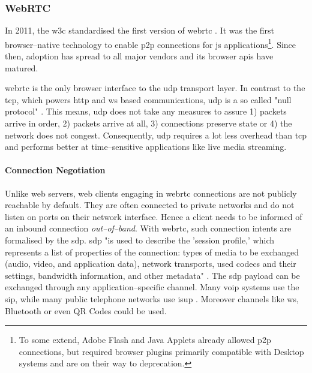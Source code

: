 \subsubsection{WebRTC}

In 2011, the \gls{w3c} standardised the first version of \gls{webrtc} \cite{webrtc-w3c}. It was the first browser–native technology to enable \gls{p2p} connections for \gls{js} applications\footnote{To some extend, Adobe Flash and Java Applets already allowed \gls{p2p} connections, but required browser plugins primarily compatible with Desktop systems and are on their way to deprecation.}. Since then, adoption has spread to all major vendors \cite{webrtc-browser-compat} and its browser \glspl{api} have matured.

\gls{webrtc} is the only browser interface to the \gls{udp} transport layer. In contrast to the \gls{tcp}, which powers \gls{http} and \gls{ws} based communications, \gls{udp} is a so called "null protocol" \cite[p. 36]{high-performance-browser-networking}. This means, \gls{udp} does not take any measures to assure 1) packets arrive in order, 2) packets arrive at all, 3) connections preserve state or 4) the network does not congest. Consequently, \gls{udp} requires a lot less overhead than \gls{tcp} and performs better at time–sensitive applications like live media streaming.

\paragraph{Connection Negotiation}
Unlike web servers, web clients engaging in \gls{webrtc} connections are not publicly reachable by default. They are often connected to private networks and do not listen on ports on their network interface.
Hence a client needs to be informed of an inbound connection \textit{out–of–band}. With \gls{webrtc}, such connection intents are formalised by the \gls{sdp}. \gls{sdp} "is used to describe the 'session profile,' which represents a list of properties of the connection: types of media to be exchanged (audio, video, and application data), network transports, used codecs and their settings, bandwidth information, and other metadata" \cite[p. 323]{high-performance-browser-networking}.
The \gls{sdp} payload \cite[\S5]{sdp-rfc} can be exchanged through any application–specific channel. Many \gls{voip} systems use the \gls{sip}, while many public telephone networks use \gls{isup} \cite[p. 321]{high-performance-browser-networking}. Moreover channels like \gls{ws}, Bluetooth or even QR Codes could be used.

